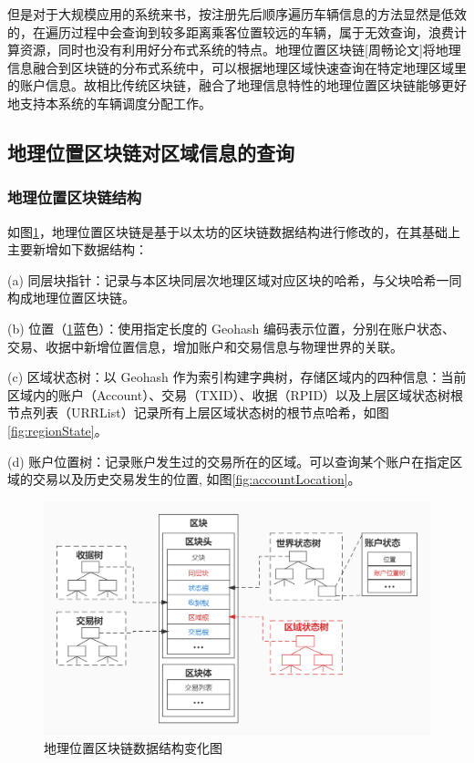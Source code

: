 但是对于大规模应用的系统来书，按注册先后顺序遍历车辆信息的方法显然是低效的，在遍历过程中会查询到较多距离乘客位置较远的车辆，属于无效查询，浪费计算资源，同时也没有利用好分布式系统的特点。地理位置区块链[周畅论文]将地理信息融合到区块链的分布式系统中，可以根据地理区域快速查询在特定地理区域里的账户信息。故相比传统区块链，融合了地理信息特性的地理位置区块链能够更好地支持本系统的车辆调度分配工作。

\subsection{地理位置区块链对区域信息的查询}
\subsubsection{地理位置区块链结构}
如图\ref{fig:treeBlockchain}，地理位置区块链是基于以太坊的区块链数据结构进行修改的，在其基础上主要新增如下数据结构：

(a) 同层块指针：记录与本区块同层次地理区域对应区块的哈希，与父块哈希一同构成地理位置区块链。

(b) 位置（\ref{fig:treeBlockchain}蓝色）：使用指定长度的 Geohash 编码表示位置，分别在账户状态、交易、收据中新增位置信息，增加账户和交易信息与物理世界的关联。

(c) 区域状态树：以 Geohash 作为索引构建字典树，存储区域内的四种信息：当前区域内的账户（Account）、交易（TXID）、收据（RPID）以及上层区域状态树根节点列表（URRList）记录所有上层区域状态树的根节点哈希，如图\ref{fig:regionState}。

(d) 账户位置树：记录账户发生过的交易所在的区域。可以查询某个账户在指定区域的交易以及历史交易发生的位置, 如图\ref{fig:accountLocation}。

\begin{figure}[h]
  \centering
  \includegraphics[width=1.0\textwidth]{figures/树状区块链}
  \caption{地理位置区块链数据结构变化图}\label{fig:treeBlockchain}
\end{figure}

